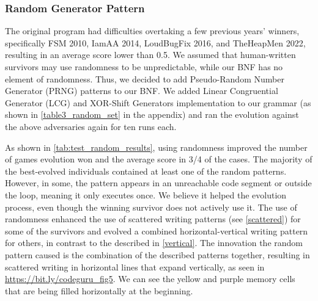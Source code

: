\documentclass[dvipsnames, format=sigconf]{acmart}
\begin{document}
\subsubsection{Random Generator Pattern}
The original program had difficulties overtaking a few previous years' winners, specifically FSM 2010, IamAA 2014, LoudBugFix 2016, and TheHeapMen 2022, resulting in an average score lower than 0.5. We assumed that human-written survivors may use randomness to be unpredictable, while our BNF has no element of randomness. Thus, we decided to add Pseudo-Random Number Generator (PRNG) patterns to our BNF. 
We added Linear Congruential Generator (LCG) and XOR-Shift Generators implementation to our grammar (as shown in \autoref{table3_random_set} in the appendix) and ran the evolution against the above adversaries again for ten runs each.


As shown in \autoref{tab:test_random_results}, using randomness improved the number of games evolution won and the average score in 3/4 of the cases.
The majority of the best-evolved individuals contained at least one of the random patterns. However, in some, the pattern appears in an unreachable code segment or outside the loop, meaning it only executes once. We believe it helped the evolution process, even though the winning survivor does not actively use it.
The use of randomness enhanced the use of scattered writing patterns (see \autoref{scattered}) for some of the survivors and evolved a combined horizontal-vertical writing pattern for others, in contrast to the described in \autoref{vertical}. The innovation the random pattern caused is the combination of the described patterns together, resulting in scattered writing in horizontal lines that expand vertically, as seen in \url{https://bit.ly/codeguru_fig5}. We can see the yellow and purple memory cells that are being filled horizontally at the beginning. %
\end{document}
